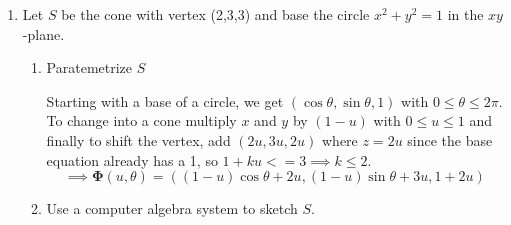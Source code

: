 \documentclass{article}
\begin{document}
\begin{enumerate}
    \item Let $S$ be the cone with vertex (2,3,3) and base the circle $x^2 + y^2 = 1$ in the $xy$-plane.
        \begin{enumerate}
            \item Paratemetrize $S$

            Starting with a base of a circle, we get $(\cos \theta, \sin \theta, 1)$ with $0 \leq \theta \leq 2\pi$. To change into a cone multiply $x$ and $y$ by $(1-u)$ with $0 \leq u \leq 1$ and finally to shift the vertex, add $(2u, 3u, 2u)$ where $z = 2u$ since the base equation already has a 1, so $1 + ku <= 3 \implies k \leq 2$.
            \[ \implies \boldsymbol \Phi (u,\theta) = ( (1-u)\cos \theta + 2 u, (1-u)\sin \theta + 3u, 1 + 2u) \] 
            \item Use a computer algebra system to sketch $S$.


\end{enumerate}
\end{enumerate}
\end{document}
